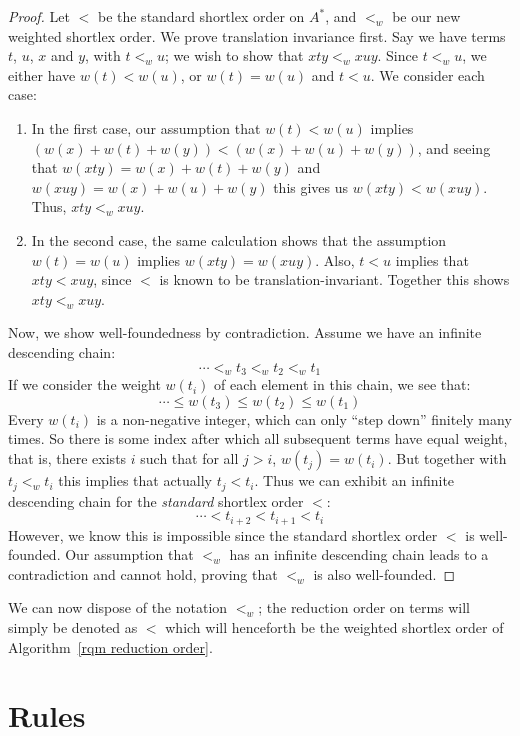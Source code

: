 \documentclass[../generics]{subfiles}
\begin{document}
\begin{proof}
Let $<$ be the standard shortlex order on $A^*$, and $<_w$ be our new weighted shortlex order. We prove translation invariance first. Say we have terms $t$, $u$, $x$ and $y$, with $t<_w u$; we wish to show that $xty<_w xuy$. Since $t<_w u$, we either have $w(t)<w(u)$, or $w(t)=w(u)$ and $t<u$. We consider each case:
\begin{enumerate}
\item In the first case, our assumption that $w(t)<w(u)$ implies $(w(x)+w(t)+w(y))<(w(x)+w(u)+w(y))$, and seeing that $w(xty)=w(x)+w(t)+w(y)$ and $w(xuy)=w(x)+w(u)+w(y)$ this gives us $w(xty)<w(xuy)$. Thus, $xty<_w xuy$.
\item In the second case, the same calculation shows that the assumption $w(t)=w(u)$ implies $w(xty)=w(xuy)$. Also, $t<u$ implies that $xty<xuy$, since $<$ is known to be translation-invariant. Together this shows $xty<_w xuy$.
\end{enumerate}
Now, we show well-foundedness by contradiction. Assume we have an infinite descending chain:
\[\cdots<_w  t_3<_w t_2<_w t_1\]
If we consider the weight $w(t_i)$ of each element in this chain, we see that:
\[\cdots\le w(t_3)\le w(t_2)\le w(t_1)\]
Every $w(t_i)$ is a non-negative integer, which can only ``step down'' finitely many times. So there is some index after which all subsequent terms have equal weight, that is, there exists $i$ such that for all $j>i$, $w(t_j)=w(t_i)$. But together with $t_j<_w t_i$ this implies that actually $t_j < t_i$. Thus we can exhibit an infinite descending chain for the \emph{standard} shortlex order $<$:
\[\cdots<t_{i+2}<t_{i+1}<t_i\]
However, we know this is impossible since the standard shortlex order $<$ is well-founded. Our assumption that $<_w$ has an infinite descending chain leads to a contradiction and cannot hold, proving that $<_w$ is also well-founded.
\end{proof}
We can now dispose of the notation $<_w$; the reduction order on terms will simply be denoted as $<$ which will henceforth be the weighted shortlex order of Algorithm~\ref{rqm reduction order}.

\section{Rules}\label{building rules}
\end{document}
